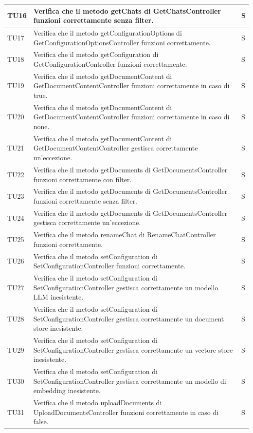 \documentclass[10pt, a4paper]{article}
\begin{document}
\begin{xltabular}{\textwidth}{p{0.12\textwidth}|p{0.7\textwidth}|X}
\hline
TU16 & Verifica che il metodo getChats di GetChatsController funzioni correttamente senza filter. & S \\
\hline
TU17 & Verifica che il metodo getConfigurationOptions di GetConfigurationOptionsController funzioni correttamente. & S \\
\hline
TU18 & Verifica che il metodo getConfiguration di GetConfigurationController funzioni correttamente. & S \\
\hline
TU19 & Verifica che il metodo getDocumentContent di GetDocumentContentController funzioni correttamente in caso di true. & S \\
\hline
TU20 & Verifica che il metodo getDocumentContent di GetDocumentContentController funzioni correttamente in caso di none. & S \\
\hline
TU21 & Verifica che il metodo getDocumentContent di GetDocumentContentController gestisca correttamente un'eccezione. & S \\
\hline
TU22 & Verifica che il metodo getDocuments di GetDocumentsController funzioni correttamente con filter. & S \\
\hline
TU23 & Verifica che il metodo getDocuments di GetDocumentsController funzioni correttamente senza filter. & S \\
\hline
TU24 & Verifica che il metodo getDocuments di GetDocumentsController gestisca correttamente un'eccezione. & S \\
\hline
TU25 & Verifica che il metodo renameChat di RenameChatController funzioni correttamente. & S \\
\hline
TU26 & Verifica che il metodo setConfiguration di SetConfigurationController funzioni correttamente. & S \\
\hline
TU27 & Verifica che il metodo setConfiguration di SetConfigurationController gestisca correttamente un modello LLM inesistente. & S \\
\hline
TU28 & Verifica che il metodo setConfiguration di SetConfigurationController gestisca correttamente un document store inesistente. & S \\
\hline
TU29 & Verifica che il metodo setConfiguration di SetConfigurationController gestisca correttamente un vectore store inesistente. & S \\
\hline
TU30 & Verifica che il metodo setConfiguration di SetConfigurationController gestisca correttamente un modello di embedding inesistente. & S \\
\hline
TU31 & Verifica che il metodo uploadDocuments di UploadDocumentsController funzioni correttamente in caso di false. & S \\

\end{xltabular}
\end{document}
